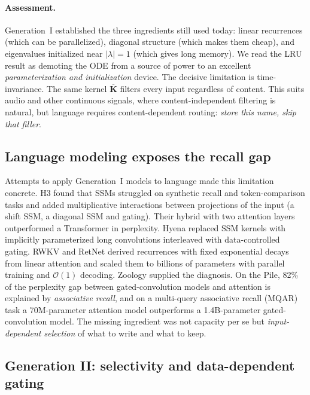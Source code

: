 \documentclass[a4paper]{article}
\newcommand{\Kb}{\overline{\mathbf{K}}}
\newcommand{\bigO}{\mathcal{O}}
\theoremstyle{plain}
\theoremstyle{remark}
\begin{document}
\paragraph{Assessment.} Generation~I established the three ingredients still used today: linear recurrences (which can be parallelized), diagonal structure (which makes them cheap), and eigenvalues initialized near $|\lambda|=1$ (which gives long memory). We read the LRU result as demoting the ODE from a source of power to an excellent \emph{parameterization and initialization} device. The decisive limitation is time-invariance. The same kernel $\Kb$ filters every input regardless of content. This suits audio and other continuous signals, where content-independent filtering is natural, but language requires content-dependent routing: \emph{store this name, skip that filler}.

\subsection{Language modeling exposes the recall gap}
\label{sec:gap}
Attempts to apply Generation~I models to language made this limitation concrete. H3 \citep{fu2023h3} found that SSMs struggled on synthetic recall and token-comparison tasks and added multiplicative interactions between projections of the input (a shift SSM, a diagonal SSM and gating). Their hybrid with two attention layers outperformed a Transformer in perplexity. Hyena \citep{poli2023hyena} replaced SSM kernels with implicitly parameterized long convolutions interleaved with data-controlled gating. RWKV \citep{peng2023rwkv} and RetNet \citep{sun2023retnet} derived recurrences with fixed exponential decays from linear attention and scaled them to billions of parameters with parallel training and $\bigO(1)$ decoding. Zoology \citep{arora2024zoology} supplied the diagnosis. On the Pile, 82\% of the perplexity gap between gated-convolution models and attention is explained by \emph{associative recall}, and on a multi-query associative recall (MQAR) task a 70M-parameter attention model outperforms a 1.4B-parameter gated-convolution model. The missing ingredient was not capacity per se but \emph{input-dependent selection} of what to write and what to keep.

\subsection{Generation II: selectivity and data-dependent gating}
\label{sec:gen2}
\end{document}

